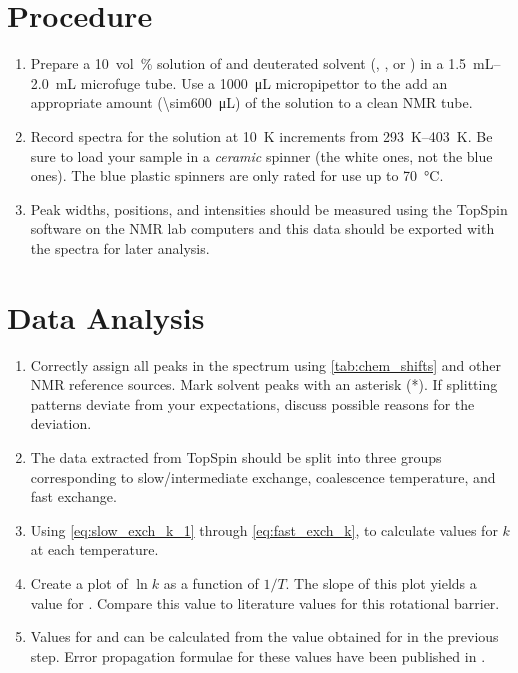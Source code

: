 \section{Procedure} %
\label{sec:procedure}

\begin{enumerate}
	\item Prepare a \qty{10}{vol\percent} solution of  and deuterated solvent (, , or ) in  a \SIrange{1.5}{2.0}{\mL} microfuge tube.
	Use a \qty{1000}{\uL} micropipettor to the add an appropriate amount (\qty{\sim600}{\uL}) of the solution to a clean NMR tube. 
	\item Record \NMR* spectra for the solution at \qty{10}{\kelvin} increments from \SIrange{293}{403}{\kelvin}.
	Be sure to load your sample in a \emph{ceramic} spinner (the white ones, not the blue ones). 
	The blue plastic spinners are only rated for use up to \qty{70}{\celsius}. 
	\item Peak widths, positions, and intensities should be measured using the TopSpin software on the NMR lab computers and this data should be exported with the spectra for later analysis. 
\end{enumerate}


\section{Data Analysis} %
\label{sec:data_analysis}

\begin{enumerate}
	\item Correctly assign all peaks in the spectrum using \cref{tab:chem_shifts} and other NMR reference sources.\autocite{davis1965advanced,pople1959nmr,silverstein2005spec,burdett1964a,rogers1956a}
	Mark solvent peaks with an asterisk (*). If splitting patterns deviate from your expectations, discuss possible reasons for the deviation. 
	\item The data extracted from TopSpin should be split into three groups corresponding to slow/intermediate exchange, coalescence temperature, and fast exchange. 
	\item Using \cref{eq:slow_exch_k_1} through \cref{eq:fast_exch_k}, to calculate values for \( k \) at each temperature. 
	\item Create a plot of \( \ln{k} \)  as a function of \( 1/T \). 
  The slope of this plot yields a value for . 
  Compare this value to literature values for this rotational barrier. 
	\item Values for  and  can be calculated from the value obtained for  in the previous step. 
  Error propagation formulae for these values have been published in \textcite{morse94nmr}.
\end{enumerate}

